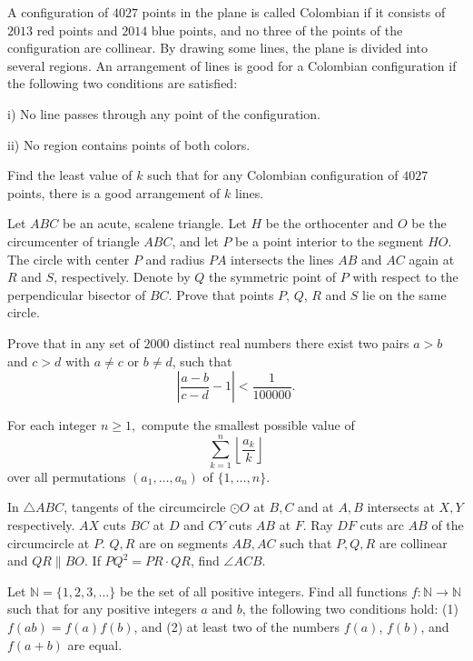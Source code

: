 \documentclass[11pt]{scrartcl}
\begin{document}
\begin{problem}[155530102293601]
A configuration of $4027$ points in the plane is called Colombian if it consists of $2013$ red points and $2014$ blue points, and no three of the points of the configuration are collinear. By drawing some lines, the plane is divided into several regions. An arrangement of lines is good for a Colombian configuration if the following two conditions are satisfied:

i) No line passes through any point of the configuration.

ii) No region contains points of both colors.

Find the least value of $k$ such that for any Colombian configuration of $4027$ points, there is a good arrangement of $k$ lines.
\end{problem}
\begin{problem}[156471770451237]
	Let $ABC$ be an acute, scalene triangle. Let $H$ be the orthocenter and $O$ be the circumcenter of triangle $ABC$, and let $P$ be a point interior to the segment $HO.$ The circle with center $P$ and radius $PA$ intersects the lines $AB$ and $AC$ again at $R$ and $S$, respectively. Denote by $Q$ the symmetric point of $P$ with respect to the perpendicular bisector of $BC$. Prove that points $P$, $Q$, $R$ and $S$ lie on the same circle.
\end{problem}
\begin{problem}[158732792334122]
	Prove that in any set of $2000$ distinct real numbers there exist two pairs $a>b$ and $c>d$ with $a \neq c$ or $b \neq d $, such that\[ \left| \frac{a-b}{c-d} - 1 \right|< \frac{1}{100000}. \]
\end{problem}
\begin{problem}[161342796381450]
For each integer $n\ge 1,$ compute the smallest possible value of\[\sum_{k=1}^{n}\left\lfloor\frac{a_k}{k}\right\rfloor\]over all permutations $(a_1,\dots,a_n)$ of $\{1,\dots,n\}.$
\end{problem}
\begin{problem}[162618813015033]
In $\triangle {ABC}$, tangents of the circumcircle $\odot {O}$ at $B, C$ and at $A, B$ intersects at $X, Y$ respectively. $AX$ cuts $BC$ at ${D}$ and $CY$ cuts $AB$ at ${F}$. Ray $DF$ cuts arc $AB$ of the circumcircle at ${P}$. $Q, R$ are on segments $AB, AC$ such that $P, Q, R$ are collinear and $QR \parallel BO$. If $PQ^2=PR \cdot QR$, find $\angle ACB$.
\end{problem}
\begin{problem}[162858780891462]
Let $\mathbb{N}=\{1, 2, 3, \dots\}$ be the set of all positive integers. Find all functions $f : \mathbb{N} \rightarrow \mathbb{N}$ such that for any positive integers $a$ and $b$, the following two conditions hold:
(1) $f(ab) = f(a)f(b)$, and
(2) at least two of the numbers $f(a)$, $f(b)$, and $f(a+b)$ are equal.
\end{problem}
\end{document}

